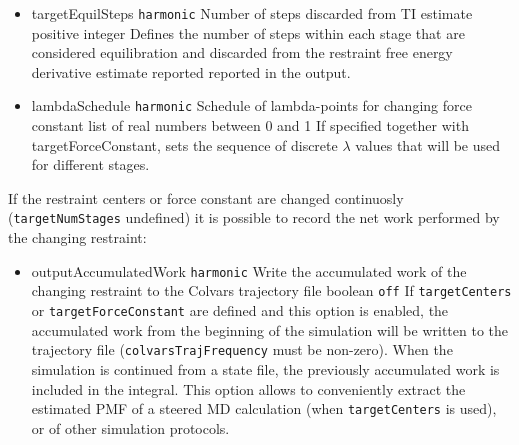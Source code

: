 \begin{itemize}
\item %
  \key
    {targetEquilSteps}{%
    \texttt{harmonic}}{%
    Number of steps discarded from TI estimate}{%
    positive integer}{%
    Defines the number of steps within each stage that are considered
    equilibration and discarded from the restraint free energy derivative
    estimate reported reported in the output.}

\item %
  \key
    {lambdaSchedule}{%
    \texttt{harmonic}}{%
    Schedule of lambda-points for changing force constant}{%
    list of real numbers between 0 and 1}{%
    If specified together with targetForceConstant, sets the sequence of
    discrete $\lambda$ values that will be used for different stages.
  }

\end{itemize}



If the restraint centers or force constant are changed continuosly (\texttt{targetNumStages} undefined) it is possible to record the net work performed by the changing restraint:
\begin{itemize}
\item %
  \keydef
    {outputAccumulatedWork}{%
    \texttt{harmonic}}{%
    Write the accumulated work of the changing restraint to the Colvars trajectory file}{%
    boolean}{%
    \texttt{off}}{%
    If \texttt{targetCenters} or \texttt{targetForceConstant} are defined and this option is enabled, the accumulated work from the beginning of the simulation will be written to the trajectory file (\texttt{colvarsTrajFrequency} must be non-zero).
    When the simulation is continued from a state file, the previously accumulated work is included in the integral.
    This option allows to conveniently extract the estimated PMF of a steered MD calculation (when \texttt{targetCenters} is used), or of other simulation protocols.
}
\end{itemize}



